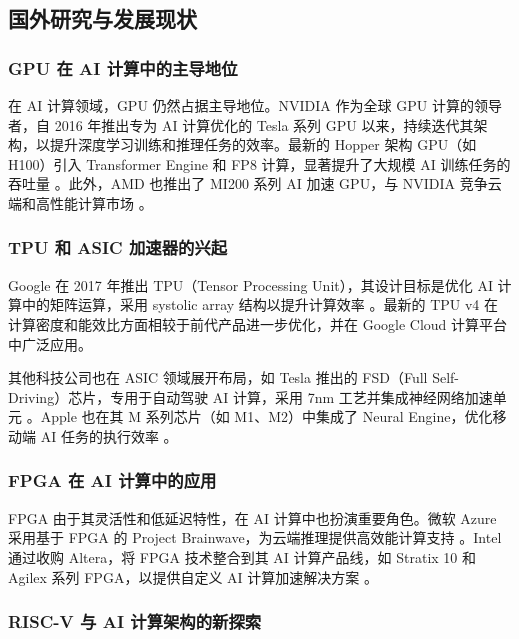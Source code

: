 \subsection{国外研究与发展现状}

\subsubsection{GPU 在 AI 计算中的主导地位}

在 AI 计算领域，GPU 仍然占据主导地位。NVIDIA 作为全球 GPU 计算的领导者，自 2016 年推出专为 AI 计算优化的 Tesla 系列 GPU 以来，持续迭代其架构，以提升深度学习训练和推理任务的效率。最新的 Hopper 架构 GPU（如 H100）引入 Transformer Engine 和 FP8 计算，显著提升了大规模 AI 训练任务的吞吐量 \cite{nvidia2022hopper}。此外，AMD 也推出了 MI200 系列 AI 加速 GPU，与 NVIDIA 竞争云端和高性能计算市场 \cite{amd2021mi200}。

\subsubsection{TPU 和 ASIC 加速器的兴起}

Google 在 2017 年推出 TPU（Tensor Processing Unit），其设计目标是优化 AI 计算中的矩阵运算，采用 systolic array 结构以提升计算效率 \cite{jouppi2017datacenter}。最新的 TPU v4 在计算密度和能效比方面相较于前代产品进一步优化，并在 Google Cloud 计算平台中广泛应用。

其他科技公司也在 ASIC 领域展开布局，如 Tesla 推出的 FSD（Full Self-Driving）芯片，专用于自动驾驶 AI 计算，采用 7nm 工艺并集成神经网络加速单元 \cite{tesla2020fsd}。Apple 也在其 M 系列芯片（如 M1、M2）中集成了 Neural Engine，优化移动端 AI 任务的执行效率 \cite{apple2021neural}。

\subsubsection{FPGA 在 AI 计算中的应用}

FPGA 由于其灵活性和低延迟特性，在 AI 计算中也扮演重要角色。微软 Azure 采用基于 FPGA 的 Project Brainwave，为云端推理提供高效能计算支持 \cite{microsoft2019brainwave}。Intel 通过收购 Altera，将 FPGA 技术整合到其 AI 计算产品线，如 Stratix 10 和 Agilex 系列 FPGA，以提供自定义 AI 计算加速解决方案 \cite{intel2020agilex}。

\subsubsection{RISC-V 与 AI 计算架构的新探索}

